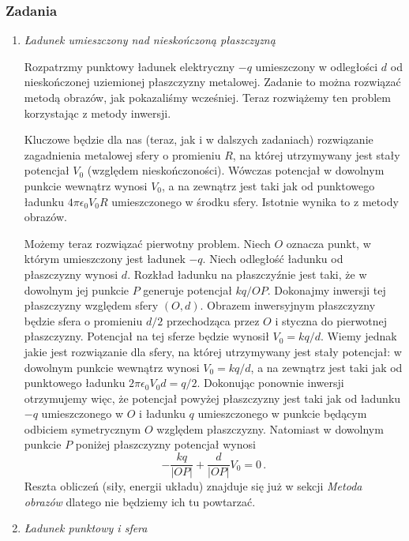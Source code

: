 \documentclass[../main.tex]{subfiles}
\begin{document}
\subsubsection*{Zadania}
\begin{enumerate}
    \item \textit{Ładunek umieszczony nad nieskończoną płaszczyzną}
    \medskip
    
    Rozpatrzmy punktowy ładunek elektryczny \(-q\) umieszczony w odległości \(d\) od nieskończonej uziemionej płaszczyzny metalowej. Zadanie to można rozwiązać metodą obrazów, jak pokazaliśmy wcześniej. Teraz rozwiążemy ten problem korzystając z metody inwersji.
    \medskip
    
    Kluczowe będzie dla nas (teraz, jak i w dalszych zadaniach) rozwiązanie zagadnienia metalowej sfery o promieniu \(R\), na której utrzymywany jest stały potencjał \(V_0\) (względem nieskończoności). Wówczas potencjał w dowolnym punkcie wewnątrz wynosi \(V_0\), a na zewnątrz jest taki jak od punktowego ładunku \(4\pi\epsilon_0V_0R\) umieszczonego w środku sfery. Istotnie wynika to z metody obrazów.
    \medskip
    
    Możemy teraz rozwiązać pierwotny problem. Niech \(O\) oznacza punkt, w którym umieszczony jest ładunek \(-q\). Niech odległość ładunku od płaszczyzny wynosi \(d\). Rozkład ładunku na płaszczyźnie jest taki, że w dowolnym jej punkcie \(P\) generuje potencjał \(kq/OP\). Dokonajmy inwersji tej płaszczyzny względem sfery \((O,d)\). Obrazem inwersyjnym płaszczyzny będzie sfera o promieniu \(d/2\) przechodząca przez \(O\) i styczna do pierwotnej płaszczyzny. Potencjał na tej sferze będzie wynosił \(V_0=kq/d\). Wiemy jednak jakie jest rozwiązanie dla sfery, na której utrzymywany jest stały potencjał: w dowolnym punkcie wewnątrz wynosi \(V_0=kq/d\), a na zewnątrz jest taki jak od punktowego ładunku \(2\pi\epsilon_0V_0d=q/2\). Dokonując ponownie inwersji otrzymujemy więc, że potencjał powyżej płaszczyzny jest taki jak od ładunku \(-q\) umieszczonego w \(O\) i ładunku \(q\) umieszczonego w punkcie będącym odbiciem symetrycznym \(O\) względem płaszczyzny. Natomiast w dowolnym punkcie \(P\) poniżej płaszczyzny potencjał wynosi
    \begin{equation*}
        -\frac{kq}{|OP|}+\frac{d}{|OP|}V_0=0\,.
    \end{equation*}
    Reszta obliczeń (siły, energii układu) znajduje się już w sekcji \textit{Metoda obrazów} dlatego nie będziemy ich tu powtarzać.
    \item \textit{Ładunek punktowy i sfera}
    \medskip
    

\end{enumerate}
\end{document}
